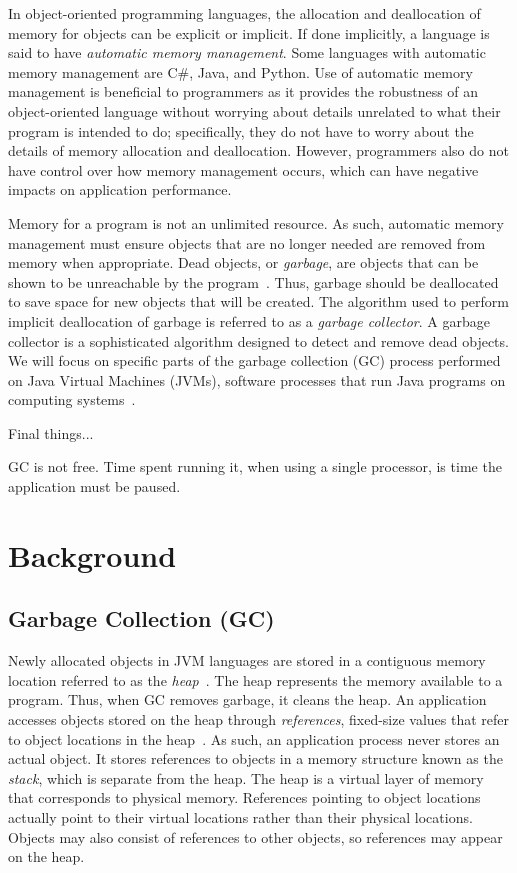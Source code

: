 \documentclass{sig-alternate}
\begin{document}
In object-oriented programming languages, the allocation and deallocation
of memory for objects can be explicit or implicit. If done implicitly,
a language is said to have \emph{automatic memory management}. Some languages 
with automatic memory management are C\#, Java, and Python.
Use of automatic memory management is beneficial to programmers as it provides
the robustness of an object-oriented language without worrying about
details unrelated to what their program is intended to do; specifically, they do
not have to worry about the details of memory allocation and deallocation. 
However, programmers also do not have control over how memory management occurs,
which can have negative impacts on application performance.

Memory for a program is not an unlimited resource. As such, automatic memory management
must ensure objects that are no longer needed are removed from memory
when appropriate. Dead objects, or \emph{garbage}, are objects that can be shown
to be unreachable by the program~\cite{glossary:g}. Thus, garbage should be deallocated to 
save space for new objects that will be created. The algorithm used to perform implicit
deallocation of garbage is referred to as a \emph{garbage collector}.
A garbage collector is a sophisticated algorithm designed to detect
and remove dead objects. We will focus on specific parts of the 
garbage collection (GC) process performed on Java Virtual Machines 
(JVMs), software processes that run Java programs on computing systems~\cite{Lindblom:2011}.

Final things...

GC is not free. Time spent running it, when using a single processor, is time the application must be paused.


\section{Background}
\label{sec:background}


\subsection{Garbage Collection (GC)}
\label{sec:garbageCollection}

Newly allocated objects in JVM languages are stored in a contiguous memory location referred
to as the \emph{heap}~\cite{oracle:heap}. The heap represents the memory available to a program.
Thus, when GC removes garbage, it cleans the heap.
An application accesses objects stored on the heap through \emph{references},
fixed-size values that refer to object locations in the heap~\cite{reilly:reference}. 
As such, an application process never stores
an actual object. It stores references to objects in a memory structure known
as the \emph{stack}, which is separate from the heap.
The heap is a virtual layer of memory that corresponds to physical memory.
References pointing to object locations actually point to their
virtual locations rather than their physical locations. Objects may also 
consist of references to other objects, so references may appear on the heap.
\end{document}
